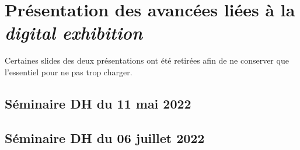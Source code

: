 \chapter{\label{Séminaires}Présentation des avancées liées à la \textit{digital exhibition}}
Certaines slides des deux présentations ont été retirées afin de ne conserver que l'essentiel pour ne pas trop charger.

\section{Séminaire DH du 11 mai 2022}

\section{Séminaire DH du 06 juillet 2022}

